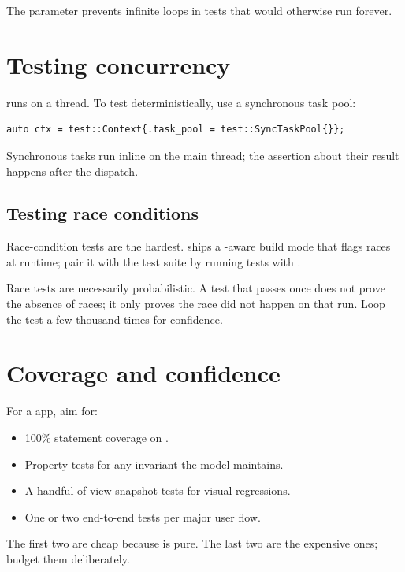 The  parameter prevents infinite loops in
tests that would otherwise run forever.

\section{Testing concurrency}

 runs on a thread. To test deterministically,
use a synchronous task pool:

\begin{lstlisting}
auto ctx = test::Context{.task_pool = test::SyncTaskPool{}};
\end{lstlisting}

Synchronous tasks run inline on the main thread; the assertion
about their result happens after the dispatch.

\subsection*{Testing race conditions}

Race-condition tests are the hardest. \maya{} ships a
-aware build mode that flags races at
runtime; pair it with the test suite by running tests with
.

\begin{warning}
Race tests are necessarily probabilistic. A test that passes
once does not prove the absence of races; it only proves the
race did not happen on that run. Loop the test a few thousand
times for confidence.
\end{warning}

\section{Coverage and confidence}

For a \maya{} app, aim for:

\begin{itemize}[leftmargin=*]
  \item 100\% statement coverage on .
  \item Property tests for any invariant the model maintains.
  \item A handful of view snapshot tests for visual regressions.
  \item One or two end-to-end tests per major user flow.
\end{itemize}

The first two are cheap because  is pure. The last
two are the expensive ones; budget them deliberately.

